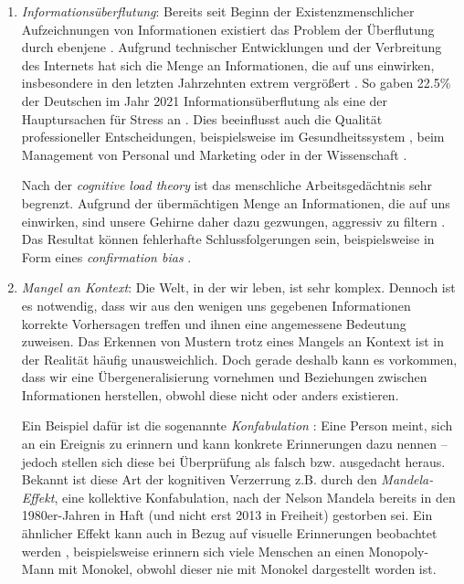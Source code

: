 \begin{enumerate}
	\item \emph{Informationsüberflutung}: Bereits seit Beginn der Existenz\break menschlicher Aufzeichnungen von Informationen existiert das Problem der Überflutung durch ebenjene \citep{bawden2020information}.
	Aufgrund technischer Entwicklungen und der Verbreitung des Internets hat sich die Menge an Informationen, die auf uns einwirken, insbesondere in den letzten Jahrzehnten extrem vergrößert \citep{siegler2010every}.
	So gaben 22.5\% der Deutschen im Jahr 2021 Informationsüberflutung als eine der Hauptursachen für Stress an \citep{meyer2021entspann}.
	Dies beeinflusst auch die Qualität professioneller Entscheidungen, beispielsweise im Gesundheitssystem \citep{hall2004information}, beim Management von Personal \citep{volnhals2008information} und Marketing \citep{meyer1998information} oder in der Wissenschaft \citep{landhuis2016scientific}.
	
	Nach der \emph{cognitive load theory} \citep{atkinson1968human} ist das menschliche Arbeitsgedächtnis sehr begrenzt.
	Aufgrund der übermächtigen Menge an Informationen, die auf uns einwirken, sind unsere Gehirne daher dazu gezwungen, aggressiv zu filtern \citep{savolainen2007filtering}.
	Das Resultat können fehlerhafte Schlussfolgerungen sein, beispielsweise in Form eines \emph{confirmation bias} \citep{goette2019information}.
	
	\item \emph{Mangel an Kontext}: Die Welt, in der wir leben, ist sehr komplex.
	Dennoch ist es notwendig, dass wir aus den wenigen uns gegebenen Informationen korrekte Vorhersagen treffen und ihnen eine angemessene Bedeutung zuweisen.
	Das Erkennen von Mustern trotz eines Mangels an Kontext ist in der Realität häufig unausweichlich.
	Doch gerade deshalb kann es vorkommen, dass wir eine Übergeneralisierung vornehmen und Beziehungen zwischen Informationen herstellen, obwohl diese nicht oder anders existieren.
	
	Ein Beispiel dafür ist die sogenannte \emph{Konfabulation} \citep{gilboa2002cognitive}:
	Eine Person meint, sich an ein Ereignis zu erinnern und kann konkrete Erinnerungen dazu nennen -- jedoch stellen sich diese bei Überprüfung als falsch bzw. ausgedacht heraus.
	Bekannt ist diese Art der kognitiven Verzerrung z.B. durch den \emph{Mandela-Effekt}, eine kollektive Konfabulation, nach der Nelson Mandela bereits in den 1980er-Jahren in Haft (und nicht erst 2013 in Freiheit) gestorben sei.
	Ein ähnlicher Effekt kann auch in Bezug auf visuelle Erinnerungen beobachtet werden \citep{prasad2022visual}, beispielsweise erinnern sich viele Menschen an einen Monopoly-Mann mit Monokel, obwohl dieser nie mit Monokel dargestellt worden ist.
	

\end{enumerate}
